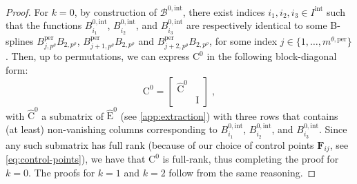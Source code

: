 \documentclass[10pt]{article}
\newcommand{\mbf}[1]{{\boldsymbol{#1}}}
\newcommand{\basis}[1]{\mathcal{#1}}
\newcommand{\mat}[1]{\mbf{\mathrm{#1}}}
\newcommand{\cU}{\theta}
\newcommand{\cV}{\rho}
\newcommand{\degU}{p^\cU}
\newcommand{\degV}{p^\cV}
\newcommand{\bsp}{B}
\newcommand{\bspB}{\basis{\bsp}}
\newcommand{\per}{\mathrm{per}}
\newcommand{\pndofU}{m^{\cU,\per}}
\newcommand{\tint}{\mathrm{int}}
\theoremstyle{plain}
\theoremstyle{definition}
\theoremstyle{remark}
\begin{document}
\begin{proof}
		For $k = 0$, by construction of $\bspB^{0,\tint}$, there exist indices $i_1, i_2, i_3 \in I^\tint$ such that the functions $\bsp^{0,\tint}_{i_1}$, $\bsp^{0,\tint}_{i_2}$, and $\bsp^{0,\tint}_{i_3}$ are respectively identical to some B-splines $\bsp^{\per}_{j,\degU}\bsp_{2,\degV}$, $\bsp^{\per}_{j+1,\degU}\bsp_{2,\degV}$ and $\bsp^{\per}_{j+2,\degU}\bsp_{2,\degV}$, for some index $j \in \{1, \ldots, \pndofU \}$. Then, up to permutations, we can express $\mat{C}^0$ in the following block-diagonal form:
		\begin{equation*}
			\mat{C}^0 = 
			\begin{bmatrix}
				\widehat{\mat{C}}^0 & \\
				& \mat{I}
			\end{bmatrix}\;,
		\end{equation*}
	   with $\widehat{\mat{C}}^0$ a submatrix of $\widehat{\mat{E}}^0$ (see \cref{app:extraction}) with three rows that contains (at least) non-vanishing columns corresponding to $\bsp^{0,\tint}_{i_1}$, $\bsp^{0,\tint}_{i_2}$, and $\bsp^{0,\tint}_{i_3}$.
	   Since any such submatrix has full rank (because of our choice of control points $\mbf{F}_{ij}$, see \eqref{eq:control-points}), we have that $\mat{C}^0$ is full-rank, thus completing the proof for $k = 0$.
	   The proofs for $k = 1$ and $k = 2$ follow from the same reasoning.


\end{proof}
\end{document}
